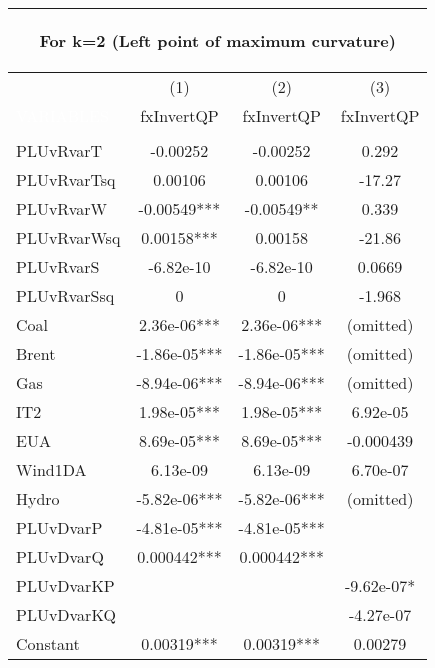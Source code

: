 \begin{center}
\begin{tabular}{lccc}
\multicolumn{4}{c}{\begin{large}For k=2 (Left point of maximum curvature)\end{large}} \\ \midrule
 & (1) & (2) & (3) \\
\textcolor{white}{VARIABLES} & fxInvertQP & fxInvertQP & fxInvertQP \\ \midrule
\vspace{4pt} & \begin{footnotesize}\end{footnotesize} & \begin{footnotesize}\end{footnotesize} & \begin{footnotesize}\end{footnotesize} \\
PLUvRvarT & -0.00252 & -0.00252 & 0.292 \\
PLUvRvarTsq & 0.00106 & 0.00106 & -17.27 \\
PLUvRvarW & -0.00549*** & -0.00549** & 0.339 \\
PLUvRvarWsq & 0.00158*** & 0.00158 & -21.86 \\
PLUvRvarS & -6.82e-10 & -6.82e-10 & 0.0669 \\
PLUvRvarSsq & 0 & 0 & -1.968 \\
Coal & 2.36e-06*** & 2.36e-06*** & (omitted) \\
Brent & -1.86e-05*** & -1.86e-05*** & (omitted)  \\
Gas & -8.94e-06*** & -8.94e-06*** & (omitted) \\
IT2 & 1.98e-05*** & 1.98e-05*** & 6.92e-05 \\
EUA & 8.69e-05*** & 8.69e-05*** & -0.000439 \\
Wind1DA & 6.13e-09 & 6.13e-09 & 6.70e-07 \\
Hydro & -5.82e-06*** & -5.82e-06*** & (omitted) \\
PLUvDvarP & -4.81e-05*** & -4.81e-05*** &  \\
PLUvDvarQ & 0.000442*** & 0.000442*** &  \\
PLUvDvarKP &  &  & -9.62e-07* \\
PLUvDvarKQ &  &  & -4.27e-07 \\
Constant & 0.00319*** & 0.00319*** & 0.00279 \\

\end{tabular}
\end{center}
